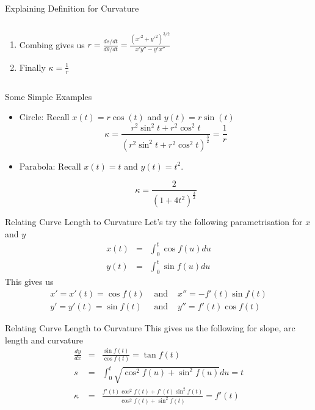 \documentclass{beamer}
\begin{document}
\begin{frame}{Explaining Definition for Curvature}
\begin{columns}
\begin{column}{0.6\textwidth}
\begin{enumerate}
				
				
				\item Combing gives us
				$r= \frac{ds/dt}{d\theta/dt} =\frac{(x'^2+y'^2)^{3/2}}{x' y'' - y' x''}$
				
				\item Finally $\kappa = \frac{1}{r}$
				
			\end{enumerate}
			
			
			
		\end{column}
	\end{columns}

	
\end{frame}

\begin{frame}{Some Simple Examples}
	\begin{itemize}	
		\item Circle: Recall $x(t)=r \cos(t)$ and $y(t)= r \sin(t)$ 
		\[
		\kappa = \frac{r^2 \sin^2 t + r^2 \cos^2 t}{\left(r^2 \sin^2 t + r^2 \cos^2 t \right) ^ \frac{3}{2}} = \frac{1}{r}
		\]
		
		\item Parabola: Recall $x(t)=t$ and $y(t)=t^2$. 
		
		\[
		\kappa = \frac{2}{\left(1 + 4t^2 \right) ^ \frac{3}{2}}
		\]
	\end{itemize}
\end{frame}

\begin{frame}{Relating Curve Length to Curvature}
	Let's try the following parametrisation for $x$ and $y$
	\begin{eqnarray*}
		x(t) &=& \int_{0}^{t} \cos f(u) du \\
		y(t) &=& \int_{0}^{t} \sin f(u) du
	\end{eqnarray*}
	This gives us
	\begin{eqnarray*}
		x' = x'(t) = \cos f(t) &\mbox{ and }& x''=-f'(t) \sin f(t) \\
		y' = y'(t) = \sin f(t) &\mbox{ and }& y''=f'(t) \cos f(t)
	\end{eqnarray*}
\end{frame}

\begin{frame}{Relating Curve Length to Curvature}
	This gives us the following for slope, arc length and curvature
	\begin{eqnarray*}
	\frac{dy}{dx} &=& \frac{\sin f(t)}{\cos f(t)} = \tan f(t) \\
 	s &=& \int_0^t \sqrt{\cos^2 f(u) + \sin^2 f(u)} du = t \\
 	\kappa &=& \frac{f'(t) \cos^2 f(t) + f'(t) \sin^2 f(t)}{\cos^2 f(t) + \sin^2 f(t)} = f'(t)
 \end{eqnarray*}
\end{frame}
\end{document}
